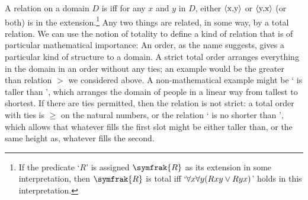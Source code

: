 \begin{earg}
A relation on a domain $D$ is  iff for any $x$ and $y$ in $D$, either $\mbox{\ensuremath{\mathopen{\langle}}x,y\ensuremath{\mathclose{\rangle}}}$ or $\mbox{\ensuremath{\mathopen{\langle}}y,x\ensuremath{\mathclose{\rangle}}}$ (or both) is in the extension.\footnote{If the predicate `$R$' is assigned $\symfrak{R}$ as its extension in some interpretation, then $\symfrak{R}$ is total iff `$\forall x \forall y (Rxy \vee Ryx)$' holds in this interpretation.} Any two things are related, in some way, by a total relation.  We can use the notion of totality to define a kind of relation that is of particular mathematical importance: 
An order, as the name suggests, gives a particular kind of structure to a domain. A strict total order arranges everything in the domain in an order without any ties; an example would be the greater than relation $>$ we considered above. A non-mathematical example might be ` is taller than ', which arranges the domain of people in a linear way from tallest to shortest. If there are ties permitted, then the relation is  not strict: a total order with ties is $≥$ on the natural numbers, or the relation ` is no shorter than ', which allows that whatever fills the first slot might be either taller than, or the same height as, whatever fills the second. 


\end{earg}
